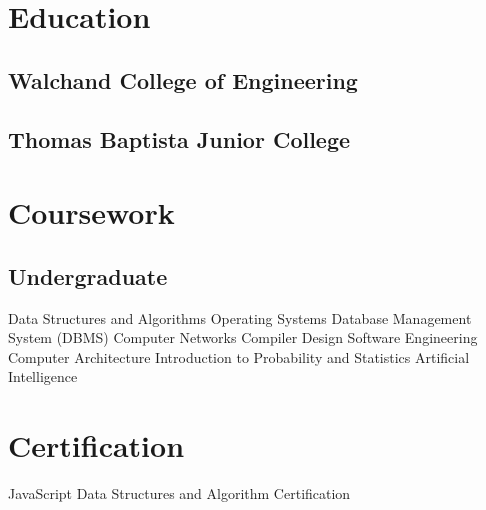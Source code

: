 \documentclass[]{resume}
\begin{document}
\begin{minipage}[t]{0.33\textwidth}


\section{Education}

\subsection{Walchand College of Engineering}
\sectionsep

\subsection{Thomas Baptista Junior College}
\sectionsep


\section{Coursework}

\subsection{Undergraduate}
    Data Structures and Algorithms \textbullet{} Operating Systems \textbullet{} Database Management System (DBMS) \textbullet{} Computer Networks \textbullet{} Compiler Design \textbullet{} Software Engineering  \textbullet{} Computer Architecture \textbullet{} Introduction to Probability and Statistics \textbullet{} Artificial Intelligence
\sectionsep


\section{Certification}
    {\small JavaScript Data Structures and Algorithm Certification \href{https://www.freecodecamp.org/certification/Daivik_L_K/javascript-algorithms-and-data-structures}{\faLink}}
\sectionsep


\end{minipage}
\end{document}
